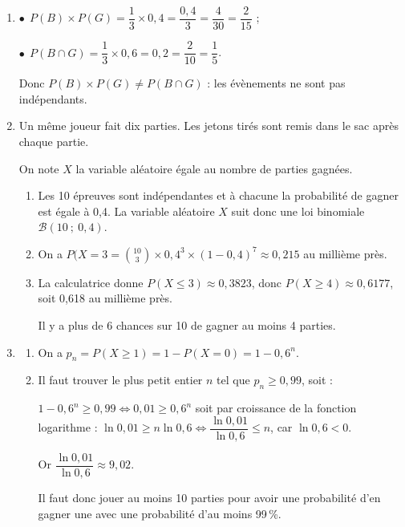 \begin{enumerate}
\begin{enumerate}
$\bullet~~$$P(R \cap G) = P(R) \times P_R(G) = \dfrac23 \times 0,3 = \dfrac{0,6}{3} = 0,2$.

Donc $P(G) = 0,2 + 0,2 = 0,4$.
		\item 
		

Il faut trouver $P_G(B) = \dfrac{P(G \cap B)}{P(G)} = \dfrac{P(B \cap G)}{P(G)} = \dfrac{0,2}{0,4} = \dfrac2 = 0,5$.
	\end{enumerate}
\item 
$\bullet~~$$P(B) \times P(G) = \dfrac13 \times 0,4 = \dfrac{0,4}{3} = \dfrac{4}{30} = \dfrac{2}{15}$ ;

$\bullet~~$$P(B \cap G) = \dfrac13 \times 0,6 = 0,2 = \dfrac{2}{10} = \dfrac15$.

Donc $P(B) \times P(G) \ne P(B \cap G)$ : les évènements ne sont pas indépendants.
\item Un même joueur fait dix parties. Les jetons tirés sont remis dans le sac après chaque partie.

On note $X$ la variable aléatoire égale au nombre de parties gagnées.
	\begin{enumerate}
		\item 
	Les 10 épreuves sont indépendantes et à chacune la probabilité de gagner est égale à 0,4. La variable aléatoire $X$ suit donc une loi binomiale $\mathcal{B}(10~;~0,4)$.
		\item 
On a $P(X = 3 = \binom{10}{3} \times 0,4^3 \times (1 - 0,4)^7 \approx 0,215$ au millième près.
		\item 
		La calculatrice donne $P(X \leqslant 3) \approx 0,3823$, donc $P(X \geqslant 4) \approx 0,6177$, soit 0,618 au millième près.
		


Il y a plus de 6 chances sur 10 de gagner au moins 4 parties.
	\end{enumerate}
\item 
	\begin{enumerate}
		\item 
On a $p_n = P(X \geqslant 1) = 1 - P(X = 0) = 1 - 0,6^n$.
		\item 
		
Il faut trouver le plus petit entier $n$ tel que $p_n \geqslant 0,99$, soit :
		
$1 - 0,6^n \geqslant 0,99 \iff 0,01 \geqslant 0,6^n$ soit par croissance de la fonction logarithme : $\ln 0,01 \geqslant n \ln 0,6 \iff \dfrac{\ln 0,01}{\ln 0,6} \leqslant n$, car $\ln 0,6 < 0$.
		
Or $\dfrac{\ln 0,01}{\ln 0,6} \approx 9,02$.
		
Il faut donc jouer au moins 10 parties pour avoir une probabilité d'en gagner une avec une probabilité d'au moins 99\,\%.
	\end{enumerate}
\end{enumerate}

\bigskip
